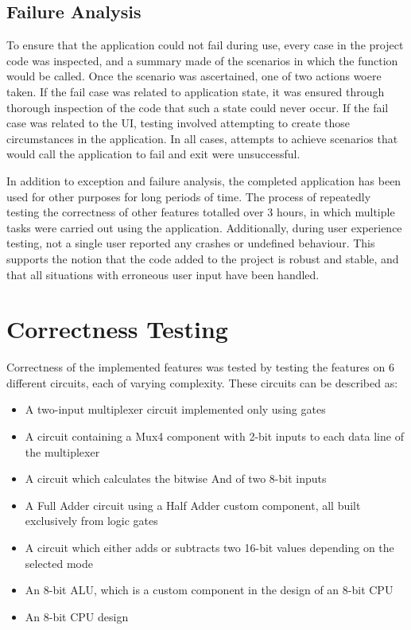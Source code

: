 \subsection{Failure Analysis}
To ensure that the application could not fail during use, every  case in the project code was inspected, and a summary made of the scenarios in which the function would be called. Once the scenario was ascertained, one of two actions woere taken. If the fail case was related to application state, it was ensured through thorough inspection of the code that such a state could never occur. If the fail case was related to the UI, testing involved attempting to create those circumstances in the application. In all cases, attempts to achieve scenarios that would call the application to fail and exit were unsuccessful. 

In addition to exception and failure analysis, the completed application has been used for other purposes for long periods of time. The process of repeatedly testing the correctness of other features totalled over 3 hours, in which multiple tasks were carried out using the application. Additionally, during user experience testing, not a single user reported any crashes or undefined behaviour. This supports the notion that the code added to the project is robust and stable, and that all situations with erroneous user input have been handled.

\section{Correctness Testing}
Correctness of the implemented features was tested by testing the features on 6 different circuits, each of varying complexity. These circuits can be described as:
\begin{itemize}
    \item A two-input multiplexer circuit implemented only using gates
    \item A circuit containing a Mux4 component with 2-bit inputs to each data line of the multiplexer
    \item A circuit which calculates the bitwise And of two 8-bit inputs
    \item A Full Adder circuit using a Half Adder custom component, all built exclusively from logic gates
    \item A circuit which either adds or subtracts two 16-bit values depending on the selected mode
    \item An 8-bit ALU, which is a custom component in the design of an 8-bit CPU
    \item An 8-bit CPU design
\end{itemize}


